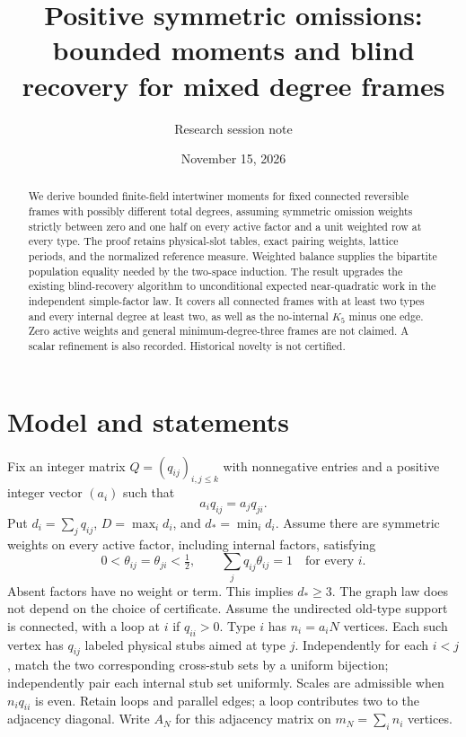 \documentclass[11pt]{article}
\title{Positive symmetric omissions:\\bounded moments and blind recovery for mixed degree frames}
\author{Research session note}
\date{November 15, 2026}
\begin{document}
\maketitle
\begin{abstract}
We derive bounded finite-field intertwiner moments for fixed connected reversible frames with possibly different total degrees, assuming symmetric omission weights strictly between zero and one half on every active factor and a unit weighted row at every type. The proof retains physical-slot tables, exact pairing weights, lattice periods, and the normalized reference measure. Weighted balance supplies the bipartite population equality needed by the two-space induction. The result upgrades the existing blind-recovery algorithm to unconditional expected near-quadratic work in the independent simple-factor law. It covers all connected frames with at least two types and every internal degree at least two, as well as the no-internal $K_5$ minus one edge. Zero active weights and general minimum-degree-three frames are not claimed. A scalar refinement is also recorded. Historical novelty is not certified.
\end{abstract}

\section{Model and statements}
Fix an integer matrix $Q=(q_{ij})_{i,j\le k}$ with nonnegative entries and a positive integer vector $(a_i)$ such that
\[
 a_iq_{ij}=a_jq_{ji}.
\]
Put $d_i=\sum_jq_{ij}$, $D=\max_i d_i$, and $d_*=\min_i d_i$. Assume there are symmetric weights on every active factor, including internal factors, satisfying
\begin{equation}\label{eq:positive}
 0<\theta_{ij}=\theta_{ji}<\tfrac12,\qquad
 \sum_jq_{ij}\theta_{ij}=1\quad\text{for every }i.
\end{equation}
Absent factors have no weight or term. This implies $d_*\ge3$. The graph law does not depend on the choice of certificate.
Assume the undirected old-type support is connected, with a loop at $i$ if $q_{ii}>0$. Type $i$ has $n_i=a_iN$ vertices. Each such vertex has $q_{ij}$ labeled physical stubs aimed at type $j$. Independently for each $i<j$, match the two corresponding cross-stub sets by a uniform bijection; independently pair each internal stub set uniformly. Scales are admissible when $n_iq_{ii}$ is even. Retain loops and parallel edges; a loop contributes two to the adjacency diagonal. Write $A_N$ for this adjacency matrix on $m_N=\sum_i n_i$ vertices.
\end{document}
